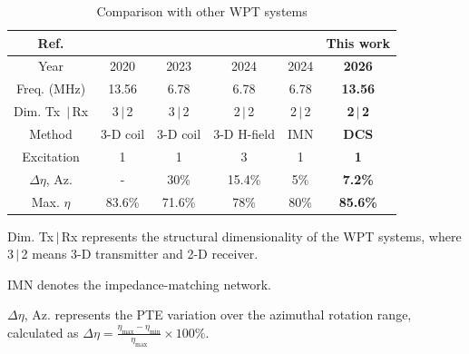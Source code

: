 \documentclass[journal]{IEEEtran}
\begin{document}
\begin{table}[!t]
\centering
\footnotesize
\setlength{\tabcolsep}{5pt}
\renewcommand{\arraystretch}{2.1}

\caption{Comparison with other WPT systems}
\label{tab1}

\begin{threeparttable}
\begin{tabular}{cccccc}
\hline
\textbf{Ref.} & \cite{comp2} & \cite{3D} & \cite{consu} & \cite{hybrid}  & \textbf{This work} \\
\hline
\hline
Year  & 2020 & 2023 & 2024 & 2024 & \textbf{2026} \\
\hline
Freq. (MHz) & 13.56 & 6.78 & 6.78 & 6.78 & \textbf{13.56} \\
\hline
Dim. Tx \,$\mid$\,Rx\tnote{1} & 3\,$\mid$\,2 & 3\,$\mid$\,2 & 2\,$\mid$\,2 & 2\,$\mid$\,2 & \textbf{2\,$\mid$\,2} \\
\hline
Method & 3-D coil & 3-D coil & 3-D H-field & IMN\tnote{2} & \textbf{DCS} \\
Excitation & 1 & 1 & 3 & 1 & \textbf{1} \\
\hline
$\Delta \eta$, Az.\tnote{3} & - & 30\% & 15.4\% & 5\% & \textbf{7.2\%} \\
\hline
Max. $\eta$ & 83.6\% & 71.6\% & 78\% & 80\% & \textbf{85.6\%} \\
\hline
\end{tabular}
\vspace{0.5em}

\begin{tablenotes}
\footnotesize
\item[1] Dim. Tx\,$\mid$\,Rx represents the structural dimensionality of the WPT systems, where 3\,$\mid$\,2 means 3-D transmitter and 2-D receiver.
\item[2] IMN denotes the impedance-matching network.
\item[3] $\Delta \eta$, Az. represents the PTE variation over the azimuthal rotation range, calculated as $\Delta \eta = \frac{\eta_{\max}-\eta_{\min}}{\eta_{\max}}\times100\%$.

\end{tablenotes}

\end{threeparttable}
\end{table}
\end{document}
